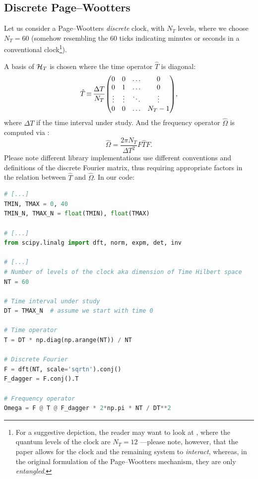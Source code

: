 \subsection{Discrete Page--Wootters}

Let us consider a Page--Wootters \emph{discrete} clock, with $N_{T}$ levels,
where we choose $N_{T} = 60$
(somehow resembling the 60 ticks indicating minutes or seconds
in a conventional clock\footnote{
  For a suggestive depiction, the reader may want to look at \cite[Fig.~1]{QClockPic},
  where the quantum levels of the clock are $N_{T} = 12$
  ---please note, however, that the paper allows for the clock
  and the remaining system to \emph{interact}, whereas, in the original formulation
  of the Page--Wootters mechanism,
  they are only \emph{entangled}.
}).

A basis of $\mathcal{H}_T$ is chosen where the time operator $\hat{T}$ is diagonal:
\begin{equation}
  \hat{T} \repr \frac{\Delta T}{N_T} \mqty(
                                          0       &0      &\ldots &0        \\
                                          0       &1      &\ldots &0        \\
                                          \vdots  &\vdots &\ddots &\vdots   \\
                                          0       &0      &\ldots &N_{T}-1
                                        ) \text{,}
\end{equation}
where $\Delta T$ if the time interval under study.
And the frequency operator $\hat{\Omega}$ is computed via :
\begin{equation}
  \hat{\Omega} = \frac{2\pi N_T}{\Delta{T}^2} F \hat{T} F \text{.}
\end{equation}
Please note different library implementations use different conventions and definitions
of the discrete Fourier matrix,
thus
requiring appropriate factors in the relation between $\hat{T}$ and $\hat{\Omega}$.
In our code:
\begin{lstlisting}[language=Python]
# [...]
TMIN, TMAX = 0, 40
TMIN_N, TMAX_N = float(TMIN), float(TMAX)

# [...]
from scipy.linalg import dft, norm, expm, det, inv

# [...]
# Number of levels of the clock aka dimension of Time Hilbert space
NT = 60

# Time interval under study
DT = TMAX_N  # assume we start with time 0

# Time operator
T = DT * np.diag(np.arange(NT)) / NT

# Discrete Fourier
F = dft(NT, scale='sqrtn').conj()
F_dagger = F.conj().T

# Frequency operator
Omega = F @ T @ F_dagger * 2*np.pi * NT / DT**2
\end{lstlisting}

